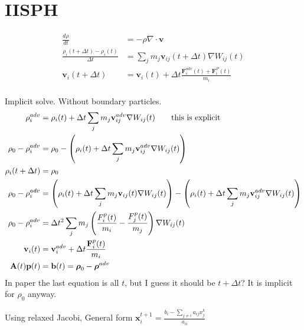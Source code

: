 \documentclass{article}
\newcommand{\dv}[2]{\frac{d #1}{d #2}}
\newcommand{\xx}{\mathbf{x}}
\renewcommand{\AA}{\mathbf{A}}
\newcommand{\FF}{\mathbf{F}}
\newcommand{\pp}{\mathbf{p}}
\newcommand{\vv}{\mathbf{v}}
\newcommand{\bb}{\mathbf{b}}
\begin{document}
\section{IISPH}

\begin{align*}
  \dv{\rho}{t} &= - \rho \nabla \cdot \vv \\
  \frac{\rho_i (t+\Delta t)  - \rho_i(t)}{\Delta t} &= \sum_j m_j \vv_{ij} (t + \Delta t) \nabla W_{ij} (t) \\
  \vv_{i} (t + \Delta t) &= \vv_i (t) + \Delta t \frac{\FF_i^{adv}(t) + \FF_i^P(t)}{m_i} \\
\end{align*}

Implicit solve. Without boundary particles.
\begin{align*}
  \rho_i^{adv} &= \rho_i(t) + \Delta t \sum_j m_j \vv_{ij}^{adv} \nabla W_{ij}(t) \text{\qquad this is explicit} \\
  \rho_0 - \rho_i^{adv} &= \rho_0 - \left( \rho_i(t) + \Delta t \sum_j m_j \vv_{ij}^{adv} \nabla W_{ij}(t) \right) \\
  \rho_i(t + \Delta t)  &= \rho_0 \\
  \rho_0 - \rho_i^{adv} &= \left( \rho_i(t) + \Delta t \sum_j m_j \vv_{ij}(t) \nabla W_{ij}(t)  \right) - \left( \rho_i(t) + \Delta t \sum_j m_j \vv_{ij}^{adv} \nabla W_{ij}(t) \right) \\
  \rho_0 - \rho_i^{adv} &= \Delta t^2 \sum_j m_j \left( \frac{F_i^p(t)}{m_i} - \frac{F_j^p(t)}{m_j} \right) \nabla W_{ij} (t) \\
  \vv_i(t)  &= \vv_i^{adv} + \Delta t \frac{\FF_i^{p}(t)}{m_i} \\
  \AA(t) \pp(t) &= \bb(t) = \boldsymbol{\rho}_0 - \boldsymbol{\rho}^{adv}  \\
\end{align*}
In paper the last equation is all $t$, but I guess it should be $t+\Delta t$? It is implicit for $\rho_0$ anyway.


Using relaxed Jacobi, General form
$\xx_i^{t+1} = \frac{ b_i - \sum_{j\ne i} a_{ij} x_j^k }{a_{ii}}  $
\end{document}
